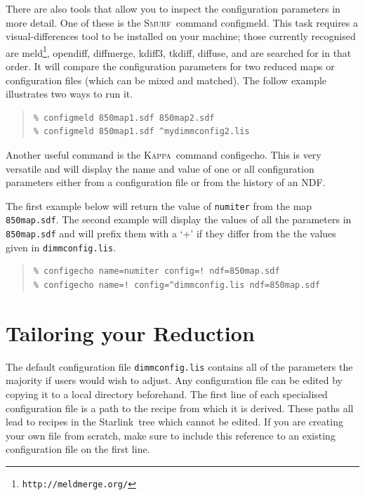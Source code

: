 \documentclass[twoside,11pt]{article}
\newcommand{\htmladdnormallink}[2]{#1}
\newcommand{\latex}[1]{#1}
\newcommand{\xref}[3]{#1}
\newcommand{\xlabel}[1]{}
\renewcommand{\_}{\texttt{\symbol{95}}}
\newenvironment{myquote}{\begin{quote}\begin{small}}{\end{small}\end{quote}}
\newcommand{\starlink}{\htmladdnormallink{Starlink}{http://starlink.jach.hawaii.edu}}
\newcommand{\Kappa}{\xref{\textsc{Kappa}}{sun95}{}}
\newcommand{\smurf}{\xref{\textsc{Smurf}}{sun258}{}}
\newcommand{\task}[1]{\textsf{#1}}
\newcommand{\configmeld}{\xref{\task{configmeld}}{sun258}{CONFIGMELD}}
\newcommand{\configecho}{\xref{\task{configecho}}{sun95}{CONFIGECHO}}
\begin{document}
There are also tools that allow you to inspect the configuration
parameters in more detail. One of these is the \smurf\ command
\configmeld. This task requires a visual-differences tool to
be installed on your machine; those currently recognised are
\htmladdnormallink{meld}{http://meldmerge.org/}\latex{\footnote{\texttt{http://meldmerge.org/}}},
\htmladdnormallink{opendiff}{http://developer.apple.com/},
\htmladdnormallink{diffmerge}{http://www.sourcegear.com/diffmerge},
\htmladdnormallink{kdiff3}{http://kdiff3.sourceforge.net},
\htmladdnormallink{tkdiff}{http://sourceforge.net/projects/tkdiff},
\htmladdnormallink{diffuse}{http://diffuse.sourceforge.net},
and are searched for in that order. It will compare the
configuration parameters for two reduced maps or configuration files
(which can be mixed and matched). The follow example illustrates two
ways to run it.

\begin{myquote}
\begin{verbatim}
% configmeld 850map1.sdf 850map2.sdf
% configmeld 850map1.sdf ^mydimmconfig2.lis
\end{verbatim}
\end{myquote}
Another useful command is the \Kappa\ command \configecho.
This is very versatile and will display the name and value of one or
all configuration parameters either from a configuration file or from
the history of an NDF.

The first example below will return the value of \texttt{numiter} from
the map \texttt{850map.sdf}. The second example will display the values of all
the parameters in \texttt{850map.sdf} and will prefix them with a `+' if they
differ from the the values given in \texttt{dimmconfig.lis}.

\begin{myquote}
\begin{verbatim}
% configecho name=numiter config=! ndf=850map.sdf
% configecho name=! config=^dimmconfig.lis ndf=850map.sdf
\end{verbatim}
\end{myquote}

\clearpage
\section{\xlabel{tweak}Tailoring your Reduction}
\label{sec:tweak}

The default configuration file \texttt{dimmconfig.lis} contains all of
the parameters the majority if users would wish to adjust. Any
configuration file can be edited by copying it to a local directory
beforehand. The first line of each specialised configuration file is a
path to the recipe from which it is derived. These paths all lead to
recipes in the \starlink\ tree which cannot be edited. If you are
creating your own file from scratch, make sure to include this
reference to an existing configuration file on the first line.
\end{document}
